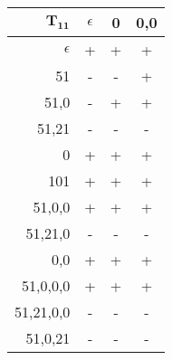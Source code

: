 \begingroup
\scriptsize
\begin{tabular}{r | c c c}
    $\mathbf{T_{11}}$ & $\epsilon$ & 0 & 0,0\\ \hline
    $\epsilon$ & + & + & + \\
    51 & - & - & + \\
    51,0 & - & + & + \\
    51,21 & - & - & - \\ \hline
    0 & + & + & + \\
    101 & + & + & + \\
    51,0,0 & + & + & + \\
    51,21,0 & - & - & - \\
    0,0 & + & + & + \\
    51,0,0,0 & + & + & + \\
    51,21,0,0 & - & - & - \\
    51,0,21 & - & - & -
\end{tabular}
\endgroup
